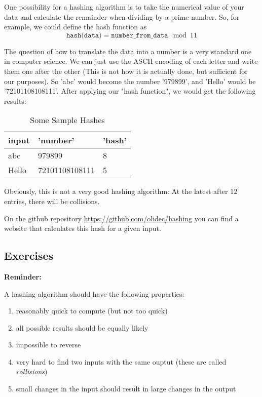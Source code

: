 \documentclass[11pt,a4paper]{report}
\begin{document}
One possibility for a hashing algorithm is to take the numerical value of your data and calculate the remainder when dividing by a prime number. So, for example, we could define the hash function as
\[
\texttt{hash(data)} = \texttt{number\_from\_data} \mod 11
\]

The question of how to translate the data into a number is a very standard one in computer science. We can just use the ASCII encoding of each letter and write them one after the other (This is not how it is actually done, but sufficient for our purposes). So 'abc' would become the number '979899', and 'Hello' would be '72101108108111'. After applying our "hash function", we would get the following results:

\begin{table}[h]
\centering
\begin{tabular}{|l|l|l|}
\hline
input & 'number' & 'hash' \\
\hline
abc & 979899 & 8 \\
Hello & 72101108108111 & 5 \\
\hline
\end{tabular}
\caption{Some Sample Hashes}
\end{table}


Obviously, this is not a very good hashing algorithm: At the latest after 12 entries, there will be collisions.

On the github repository \url{https://github.com/olidec/hashing} you can find a website that calculates this hash for a given input.

\subsection{Exercises}
{\bf Reminder: }

A hashing algorithm should have the following properties:
\begin{enumerate}
\item  reasonably quick to compute (but not too quick)
\item  all possible results should be equally likely
\item  impossible to reverse
\item  very hard to find two inputs with the same ouptut (these are called \emph{collisions})
\item  small changes in the input should result in large changes in the output
\end{enumerate}
\end{document}
